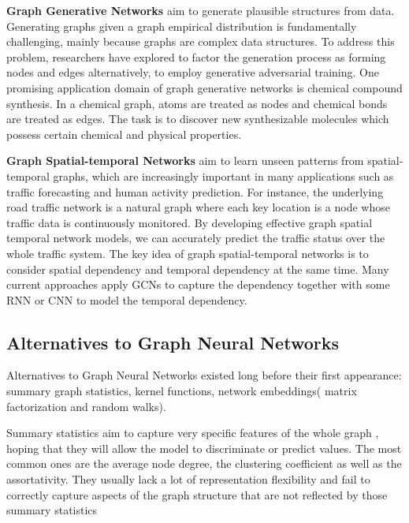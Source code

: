 \textbf{Graph Generative Networks} aim to generate plausible structures from data. Generating graphs given a graph empirical distribution is fundamentally challenging, mainly because graphs are complex data structures. To address this problem, researchers have explored to factor the generation process as forming nodes and edges alternatively, to employ generative adversarial training. One promising application domain of graph generative networks is chemical compound synthesis. In a chemical graph, atoms are treated as nodes and chemical bonds are treated as edges. The task is to discover new synthesizable molecules which possess certain chemical and physical properties. 

\textbf{Graph Spatial-temporal Networks} aim to learn unseen patterns from spatial-temporal graphs, which are increasingly important in many applications such as traffic forecasting and human activity prediction. For instance, the underlying road traffic network is a natural graph where each key location is a node whose traffic data is continuously monitored. By developing effective graph spatial temporal network models, we can accurately predict the traffic status over the whole traffic system. The key idea of graph spatial-temporal networks is to consider spatial dependency and temporal dependency at the same time. Many current approaches apply GCNs to capture the dependency together with some RNN or CNN to model the temporal dependency.


\subsection{Alternatives to Graph Neural Networks}


Alternatives to Graph Neural Networks existed long before their first appearance: summary graph statistics, kernel functions, network embeddings( matrix factorization and random walks).

Summary statistics aim to capture very specific features of the whole graph , hoping that they will allow the model to discriminate or predict values. The most common ones are the average node degree, the clustering coefficient as well as the assortativity. They usually lack a lot of representation flexibility and fail to correctly capture aspects of the graph structure that are not reflected by those summary statistics


